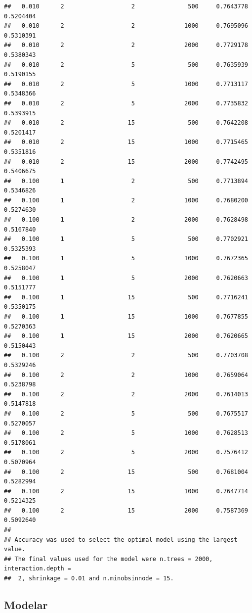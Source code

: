 \documentclass[]{article}
\begin{document}
\begin{lstlisting}
##   0.010      2                   2               500     0.7643778  0.5204404
##   0.010      2                   2              1000     0.7695096  0.5310391
##   0.010      2                   2              2000     0.7729178  0.5380343
##   0.010      2                   5               500     0.7635939  0.5190155
##   0.010      2                   5              1000     0.7713117  0.5348366
##   0.010      2                   5              2000     0.7735832  0.5393915
##   0.010      2                  15               500     0.7642208  0.5201417
##   0.010      2                  15              1000     0.7715465  0.5351816
##   0.010      2                  15              2000     0.7742495  0.5406675
##   0.100      1                   2               500     0.7713894  0.5346826
##   0.100      1                   2              1000     0.7680200  0.5274630
##   0.100      1                   2              2000     0.7628498  0.5167840
##   0.100      1                   5               500     0.7702921  0.5325393
##   0.100      1                   5              1000     0.7672365  0.5258047
##   0.100      1                   5              2000     0.7620663  0.5151777
##   0.100      1                  15               500     0.7716241  0.5350175
##   0.100      1                  15              1000     0.7677855  0.5270363
##   0.100      1                  15              2000     0.7620665  0.5150443
##   0.100      2                   2               500     0.7703708  0.5329246
##   0.100      2                   2              1000     0.7659064  0.5238798
##   0.100      2                   2              2000     0.7614013  0.5147818
##   0.100      2                   5               500     0.7675517  0.5270057
##   0.100      2                   5              1000     0.7628513  0.5178061
##   0.100      2                   5              2000     0.7576412  0.5070964
##   0.100      2                  15               500     0.7681004  0.5282994
##   0.100      2                  15              1000     0.7647714  0.5214325
##   0.100      2                  15              2000     0.7587369  0.5092640
## 
## Accuracy was used to select the optimal model using the largest value.
## The final values used for the model were n.trees = 2000, interaction.depth =
##  2, shrinkage = 0.01 and n.minobsinnode = 15.
\end{lstlisting}

\hypertarget{modelar-9}{%
\subsection{Modelar}\label{modelar-9}}
\end{document}
